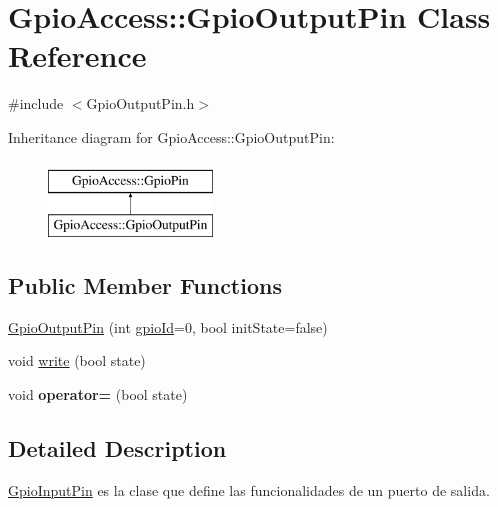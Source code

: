 \hypertarget{class_gpio_access_1_1_gpio_output_pin}{\section{\-Gpio\-Access\-:\-:\-Gpio\-Output\-Pin \-Class \-Reference}
\label{class_gpio_access_1_1_gpio_output_pin}
}


{\ttfamily \#include $<$\-Gpio\-Output\-Pin.\-h$>$}

\-Inheritance diagram for \-Gpio\-Access\-:\-:\-Gpio\-Output\-Pin\-:\begin{figure}[H]
\begin{center}
\leavevmode
\includegraphics[height=2.000000cm]{class_gpio_access_1_1_gpio_output_pin}
\end{center}
\end{figure}
\subsection*{\-Public \-Member \-Functions}
\begin{DoxyCompactItemize}
\item 
\hyperlink{class_gpio_access_1_1_gpio_output_pin_ada0b9cef6c7e820e0f66f316b344f466}{\-Gpio\-Output\-Pin} (int \hyperlink{class_gpio_access_1_1_gpio_pin_a662d9f6e22d338e0b182b3220a42f25d}{gpio\-Id}=0, bool init\-State=false)
\item 
void \hyperlink{class_gpio_access_1_1_gpio_output_pin_ab85d13a9755482435ef14e969ae89425}{write} (bool state)
\item 
\hypertarget{class_gpio_access_1_1_gpio_output_pin_a69bf2e674146c797283ae78df2d7ff04}{void {\bfseries operator=} (bool state)}\label{class_gpio_access_1_1_gpio_output_pin_a69bf2e674146c797283ae78df2d7ff04}

\end{DoxyCompactItemize}


\subsection{\-Detailed \-Description}
\hyperlink{class_gpio_access_1_1_gpio_input_pin}{\-Gpio\-Input\-Pin} es la clase que define las funcionalidades de un puerto de salida. 

